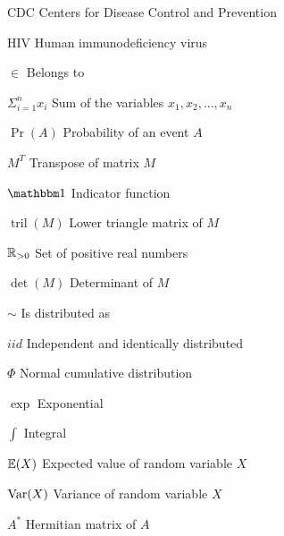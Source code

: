 \begin{siglas}
    \item[CDC] Centers for Disease Control and Prevention
    \item[HIV] Human immunodeficiency virus  
  \end{siglas}
  
  \begin{simbolos}
    \item[$\in$] Belongs to 
    \item[$\Sigma_{i=1}^n x_i$] Sum of the variables $x_1, x_2, \dots, x_n$
    \item[$\Pr(A)$] Probability of an event $A$
    \item[$M^T$] Transpose of matrix $M$
    \item[$\ind$] Indicator function 
    \item[$\operatorname{tril}(M)$] Lower triangle matrix of $M$
    \item[$\mathbb{R}_{>0}$] Set of positive real numbers
    \item[$\det(M)$] Determinant of $M$ 
    \item[$\sim$] Is distributed as 
    \item[$iid$] Independent and identically distributed
    \item[$\Phi$] Normal cumulative distribution
    \item[$\exp$] Exponential  
    \item[$\int$] Integral 
    \item[$\mathbb{E}(X)$] Expected value of random variable $X$ 
    \item[$\operatorname{Var}(X)$] Variance of random variable $X$
    \item[$A^*$] Hermitian matrix of $A$ 
  \end{simbolos}
